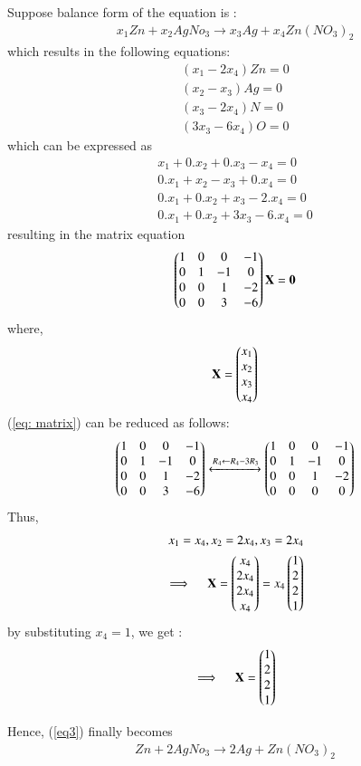 \documentclass[journal,12pt,twocolumn]{IEEEtran}
\begin{document}
Suppose balance form of the equation is :
\begin{align}
    \label{eq3} x_{1}Zn+ x_{2}AgNo_{3} \to x_{3}Ag + x_{4} Zn(NO_{3})_{2}
\end{align}
which results in the following equations:
\begin{align}
    ( x_{1} - 2x_{4} ) Zn = 0\\
    ( x_{2} - x_{3} ) Ag = 0\\
    ( x_{3} - 2 x_{4} ) N =0\\
    ( 3x_{3} - 6x_{4} ) O = 0
\end{align}
which can be expressed as
\begin{align}
    x_{1} + 0.x_{2} + 0.x_{3} - x_{4} = 0\\
    0.x_{1} + x_{2} - x_{3} + 0.x_{4} = 0\\
    0.x_{1} + 0.x_{2} + x_{3} - 2.x_{4} =0\\
    0.x_{1} + 0.x_{2} + 3x_{3} - 6.x_{4}= 0
\end{align}
resulting in the matrix equation
\begin{align}
    \label{eq: matrix}
    \begin{pmatrix}1 & 0 & 0 & -1\\
           0 & 1 & -1 & 0\\
           0 & 0 & 1 & -2\\
           0 & 0 & 3 & -6 \end{pmatrix}\mathbf{X}
           =\mathbf{0}
\end{align}
where,
\begin{align}
   \mathbf{X}= \begin{pmatrix}x_{1}\\x_{2}\\x_{3}\\x_{4}\end{pmatrix}
\end{align}
(\ref{eq: matrix}) can be reduced as follows:
\begin{align}
    \begin{pmatrix}1 & 0 & 0 & -1\\
   	0 & 1 & -1 & 0\\
   	0 & 0 & 1 & -2\\
   	0 & 0 & 3 & -6 \end{pmatrix}
    \xleftrightarrow {R_{4}\leftarrow R_4 - 3R_3}
      \begin{pmatrix}1 & 0 & 0 & -1\\
    	0 & 1 & -1 & 0\\
    	0 & 0 & 1 & -2\\
    	0 & 0 & 0 & 0 \end{pmatrix}
    \end{align}
Thus,
\begin{align}
    x_1 = x_4, x_ 2 = 2x_4, x_3 = 2x_4\\
    \implies \quad\mathbf{X } = \begin{pmatrix}x_{4} \\ 2x_{4}\\ 2x_{4} \\ x_{4}\end{pmatrix}   =  x_4 \begin{pmatrix}1\\ 2 \\ 2 \\1\end{pmatrix}
    \end{align} 
by substituting $x_4= 1$, we get :
\begin{align}
 \implies \quad\mathbf{X} = \begin{pmatrix}1\\ 2 \\ 2 \\1\end{pmatrix}
\end{align}

\hfill\break
Hence, (\ref{eq3}) finally becomes
\begin{align}
Zn + 2AgNo_{3} \to 2Ag + Zn(NO_{3})_{2}
\end{align}
\end{document}
